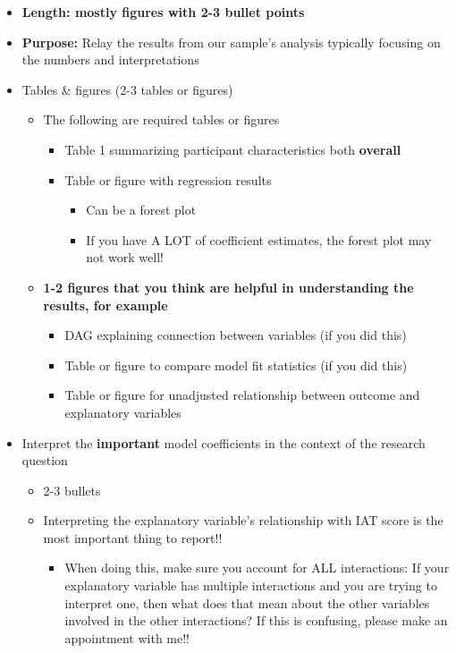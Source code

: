 \documentclass[
  letterpaper,
  DIV=11,
  numbers=noendperiod]{scrartcl}
\providecommand{\tightlist}{%
  \setlength{\itemsep}{0pt}\setlength{\parskip}{0pt}}\usepackage{longtable,booktabs,array}
\begin{document}
\begin{itemize}
\tightlist
\item
  \textbf{Length: mostly figures with 2-3 bullet points}
\item
  \textbf{Purpose:} Relay the results from our sample's analysis
  typically focusing on the numbers and interpretations
\item
  Tables \& figures (2-3 tables or figures)

  \begin{itemize}
  \tightlist
  \item
    The following are required tables or figures

    \begin{itemize}
    \tightlist
    \item
      Table 1 summarizing participant characteristics both
      \textbf{overall}
    \item
      Table or figure with regression results

      \begin{itemize}
      \tightlist
      \item
        Can be a forest plot
      \item
        If you have A LOT of coefficient estimates, the forest plot may
        not work well!
      \end{itemize}
    \end{itemize}
  \item
    \textbf{1-2 figures that you think are helpful in understanding the
    results, for example}

    \begin{itemize}
    \tightlist
    \item
      DAG explaining connection between variables (if you did this)
    \item
      Table or figure to compare model fit statistics (if you did this)
    \item
      Table or figure for unadjusted relationship between outcome and
      explanatory variables
    \end{itemize}
  \end{itemize}
\item
  Interpret the \textbf{important} model coefficients in the context of
  the research question

  \begin{itemize}
  \tightlist
  \item
    2-3 bullets
  \item
    Interpreting the explanatory variable's relationship with IAT score
    is the most important thing to report!!

    \begin{itemize}
    \tightlist
    \item
      When doing this, make sure you account for ALL interactions: If
      your explanatory variable has multiple interactions and you are
      trying to interpret one, then what does that mean about the other
      variables involved in the other interactions? If this is
      confusing, please make an appointment with me!!
    \end{itemize}
  \end{itemize}
\end{itemize}
\end{document}
